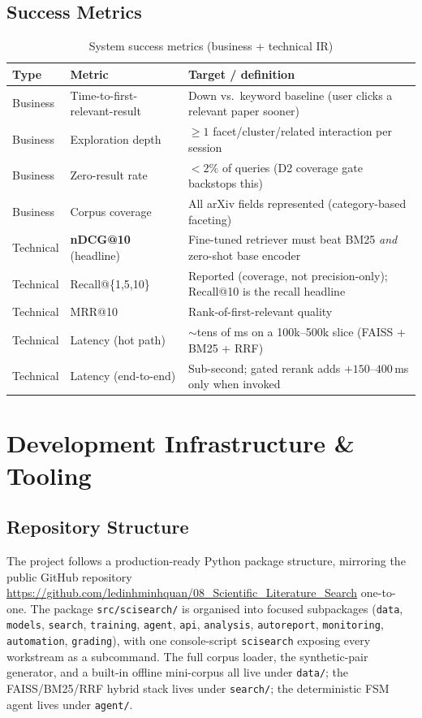 \documentclass[12pt,a4paper]{article}
\begin{document}
\subsection{Success Metrics}

\begin{table}[H]
\centering
\caption{System success metrics (business + technical IR)}
\small
\begin{tabularx}{\linewidth}{@{} l l L @{}}
\toprule
\textbf{Type} & \textbf{Metric} & \textbf{Target / definition} \\
\midrule
Business & Time-to-first-relevant-result & Down vs.\ keyword baseline (user clicks a relevant paper sooner) \\
Business & Exploration depth & $\geq 1$ facet/cluster/related interaction per session \\
Business & Zero-result rate & $<2\%$ of queries (D2 coverage gate backstops this) \\
Business & Corpus coverage & All arXiv fields represented (category-based faceting) \\
Technical & \textbf{nDCG@10} (headline) & Fine-tuned retriever must beat BM25 \emph{and} zero-shot base encoder \\
Technical & Recall@\{1,5,10\} & Reported (coverage, not precision-only); Recall@10 is the recall headline \\
Technical & MRR@10 & Rank-of-first-relevant quality \\
Technical & Latency (hot path) & $\sim$tens of ms on a 100k--500k slice (FAISS + BM25 + RRF) \\
Technical & Latency (end-to-end) & Sub-second; gated rerank adds $+150$--$400$\,ms only when invoked \\
\bottomrule
\end{tabularx}
\end{table}

\section{Development Infrastructure \& Tooling}

\subsection{Repository Structure}

The project follows a production-ready Python package structure, mirroring the public GitHub repository \url{https://github.com/ledinhminhquan/08_Scientific_Literature_Search} one-to-one. The package \texttt{src/scisearch/} is organised into focused subpackages (\texttt{data}, \texttt{models}, \texttt{search}, \texttt{training}, \texttt{agent}, \texttt{api}, \texttt{analysis}, \texttt{autoreport}, \texttt{monitoring}, \texttt{automation}, \texttt{grading}), with one console-script \texttt{scisearch} exposing every workstream as a subcommand. The full corpus loader, the synthetic-pair generator, and a built-in offline mini-corpus all live under \texttt{data/}; the FAISS/BM25/RRF hybrid stack lives under \texttt{search/}; the deterministic FSM agent lives under \texttt{agent/}.
\end{document}
